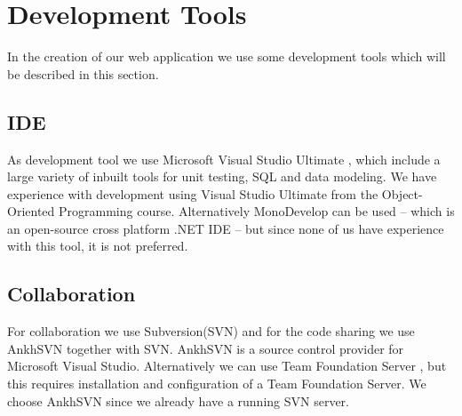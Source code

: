 \section{Development Tools}
In the creation of our web application we use some development tools which will be described in this section. 

\subsection{IDE}
\label{sub:ide}
As development tool we use Microsoft Visual Studio Ultimate \cite{visualStudio}, which include a large variety of inbuilt tools for unit testing, SQL and data modeling. 
We have experience with development using Visual Studio Ultimate from the Object-Oriented Programming course. 
Alternatively MonoDevelop \cite{mono} can be used -- which is an open-source cross platform .NET IDE -- but since none of us have experience with this tool, it is not preferred.



\subsection{Collaboration}
\label{sub:collaboration}
For collaboration we use Subversion(SVN) and for the code sharing we use AnkhSVN \cite{ankhsvn} together with SVN. 
AnkhSVN is a source control provider for Microsoft Visual Studio. 
Alternatively we can use Team Foundation Server \cite{teamfoundation}, but this requires installation and configuration of a Team Foundation Server. 
We choose AnkhSVN since we already have a running SVN server. 

\begin{comment}
\subsection{Database}
\label{sub:database}
The choice of database vendor lies between two systems: Microsoft SQL Server and PostgreSQL. Microsoft because we already use Visual Studio and ASP.NET. PostgreSQL because we use this provider in the course Software Architecture. 
We choose Microsoft SQL Server as our main data storage because it is compatible with ADO.NET Entity Data Model Designer and Visual Studio Ultimate comes with an inbuilt Microsoft SQL Server manager, which allows editing of the SQL server from our workstations and not only from the server itself. 
Using PostgreSQL with C\# and Visual Studio requires a plugin in order to use the ADO.NET Entity Data Model Designer. Since the required functionality is supported by both database systems neither choice gives us any advantages over the other on the data layer.
\end{comment}